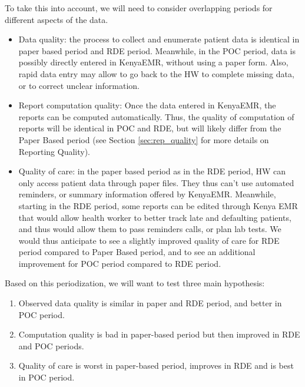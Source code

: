 To take this into account, we will need to consider overlapping periods for different aspects of the data.
\begin{itemize}
	\item	Data quality: the process to collect and enumerate patient data is identical in paper based period and RDE period. Meanwhile, in the POC period, data is possibly directly entered in KenyaEMR, without using a paper form. Also, rapid data entry may allow to go back to the HW to complete missing data, or to correct unclear information.
	\item	Report computation quality: Once the data entered in KenyaEMR, the reports can be computed automatically. Thus, the quality of computation of reports will be identical in POC and RDE, but will likely differ from the Paper Based period (see Section \ref{sec:rep_quality} for more details on Reporting Quality).
	\item	Quality of care: in the paper based period as in the RDE period, HW can only access patient data through paper files. They thus can’t use automated reminders, or summary information offered by KenyaEMR. Meanwhile, starting in the RDE period, some reports can be edited through Kenya EMR that would allow health worker to better track late and defaulting patients, and thus would allow them to pass reminders calls, or plan lab tests. We would thus anticipate to see a slightly improved quality of care for RDE period compared to Paper Based period, and to see an additional improvement for POC period compared to RDE period.
\end{itemize}

Based on this periodization, we will want to test three main hypothesis:
\begin{enumerate}
	\item	Observed data quality is similar in paper and RDE period, and better in POC period.
	\item	Computation quality is bad in paper-based period but then improved in RDE and POC periods.
	\item	Quality of care is worst in paper-based period, improves in RDE and is best in POC period.
\end{enumerate}


